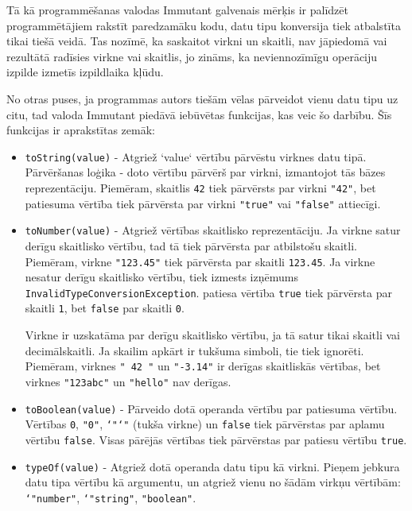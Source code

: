 \documentclass[12pt,a4paper]{report}
\begin{document}
Tā kā programmēšanas valodas Immutant galvenais mērķis ir palīdzēt programmētājiem rakstīt paredzamāku kodu, datu tipu konversija tiek atbalstīta tikai tiešā veidā. Tas nozīmē, ka saskaitot virkni un skaitli, nav jāpiedomā vai rezultātā radīsies virkne vai skaitlis, jo zināms, ka neviennozīmīgu operāciju izpilde izmetīs izpildlaika kļūdu.

No otras puses, ja programmas autors tiešām vēlas pārveidot vienu datu tipu uz citu, tad valoda Immutant piedāvā iebūvētas funkcijas, kas veic šo darbību. Šīs funkcijas ir aprakstītas zemāk:

\begin{itemize}
  \item \texttt{toString(value)} - Atgriež `value` vērtību pārvēstu virknes datu tipā.
  Pārvēršanas loģika - doto vērtību pārvērš par virkni, izmantojot tās bāzes reprezentāciju. Piemēram, skaitlis \texttt{42} tiek pārvērsts par virkni \texttt{"42"}, bet patiesuma vērtība tiek pārvērsta par virkni \texttt{"true"} vai \texttt{"false"} attiecīgi. 
  \item \texttt{toNumber(value)} - Atgriež vērtības skaitlisko reprezentāciju. Ja virkne satur derīgu skaitlisko vērtību, tad tā tiek pārvērsta par atbilstošu skaitli. Piemēram, virkne \texttt{"123.45"} tiek pārvērsta par skaitli \texttt{123.45}. Ja virkne nesatur derīgu skaitlisko vērtību, tiek izmests izņēmums \texttt{InvalidTypeConversionException}. patiesa vērtība \texttt{true} tiek pārvērsta par skaitli \texttt{1}, bet \texttt{false} par skaitli \texttt{0}. 
  
  Virkne ir uzskatāma par derīgu skaitlisko vērtību, ja tā satur tikai skaitli vai decimālskaitli. Ja skailim apkārt ir tukšuma simboli, tie tiek ignorēti. Piemēram, virknes \texttt{"  42  "} un \texttt{"-3.14"} ir derīgas skaitliskās vērtības, bet virknes \texttt{"123abc"} un \texttt{"hello"} nav derīgas.
  \item \texttt{toBoolean(value)} - Pārveido dotā operanda vērtību par patiesuma vērtību. Vērtības \texttt{0}, \texttt{"0"}, \texttt{\char`"\char`"} (tukša virkne) un \texttt{false} tiek pārvērstas par aplamu vērtību \texttt{false}. Visas pārējās vērtības tiek pārvērstas par patiesu vērtību \texttt{true}.
  \item \texttt{typeOf(value)} - Atgriež dotā operanda datu tipu kā virkni. Pieņem jebkura datu tipa vērtību kā argumentu, un atgriež vienu no šādām virkņu vērtībām: \texttt{\char`"number"}, \texttt{\char`"string"}, \texttt{"boolean"}.
\end{itemize}
\end{document}
